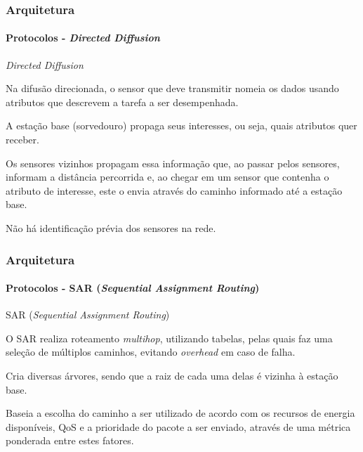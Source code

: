 \documentclass[notes]{beamer}
\begin{document}
\begin{frame}
\label{slide_52}
\frametitle{Arquitetura}
\framesubtitle{Protocolos - \textit{Directed Diffusion}}

\begin{block}{\textit{Directed Diffusion}}

Na difusão direcionada, o sensor que deve transmitir nomeia os dados usando atributos que descrevem a tarefa a ser desempenhada.

\end{block} \pause

\begin{block}

A estação base (sorvedouro) propaga seus interesses, ou seja, quais atributos quer receber. 
\end{block} \pause

\begin{block}

Os sensores vizinhos propagam essa informação que, ao passar pelos sensores, informam a distância percorrida e, ao chegar em um sensor que contenha o atributo de interesse, este o envia através do caminho informado até a estação base.

\end{block} \pause

\begin{block}

Não há identificação prévia dos sensores na rede. 

\end{block} 

\end{frame}

\begin{frame}
\label{slide_53}
\frametitle{Arquitetura}
\framesubtitle{Protocolos - SAR (\textit{Sequential Assignment Routing})}

\begin{block}{SAR (\textit{Sequential Assignment Routing})}

O SAR realiza roteamento \textit{multihop}, utilizando tabelas, pelas quais faz uma seleção de múltiplos caminhos, evitando \textit{overhead} em caso de falha.

\end{block} \pause

\begin{block}

Cria diversas árvores, sendo que a raiz de cada uma delas é vizinha à estação base. 

\end{block} \pause

\begin{block}

Baseia a escolha do caminho a ser utilizado de acordo com os recursos de energia disponíveis, QoS e a prioridade do pacote a ser enviado, através de uma métrica ponderada entre estes fatores.

\end{block}

\end{frame}
\end{document}
